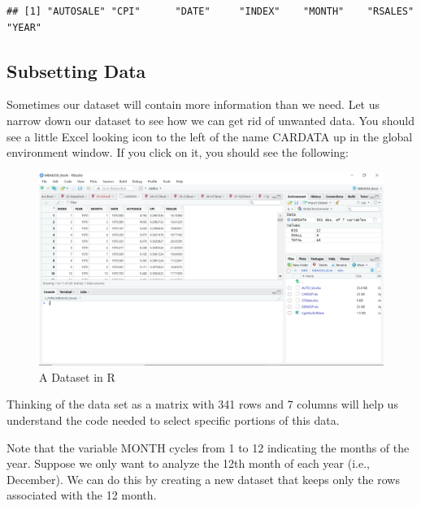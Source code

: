 \documentclass[
]{book}
\newenvironment{Shaded}{\begin{snugshade}}{\end{snugshade}}
\newcommand{\DecValTok}[1]{\textcolor[rgb]{0.00,0.00,0.81}{#1}}
\newcommand{\NormalTok}[1]{#1}
\newcommand{\OtherTok}[1]{\textcolor[rgb]{0.56,0.35,0.01}{#1}}
\newcommand{\SpecialCharTok}[1]{\textcolor[rgb]{0.00,0.00,0.00}{#1}}
\begin{document}
\begin{verbatim}
## [1] "AUTOSALE" "CPI"      "DATE"     "INDEX"    "MONTH"    "RSALES"   "YEAR"
\end{verbatim}

\hypertarget{subsetting-data}{%
\subsection{Subsetting Data}\label{subsetting-data}}

Sometimes our dataset will contain more information than we need. Let us narrow down our dataset to see how we can get rid of unwanted data. You should see a little Excel looking icon to the left of the name CARDATA up in the global environment window. If you click on it, you should see the following:

\begin{figure}

{\centering \includegraphics[width=0.75\linewidth]{images/Screenshot4} 

}

\caption{A Dataset in R}\label{fig:unnamed-chunk-40}
\end{figure}

Thinking of the data set as a matrix with 341 rows and 7 columns will help us understand the code needed to select specific portions of this data.

Note that the variable MONTH cycles from 1 to 12 indicating the months of the year. Suppose we only want to analyze the 12th month of each year (i.e., December). We can do this by creating a new dataset that keeps only the rows associated with the 12 month.

\begin{Shaded}
\end{Shaded}
\end{document}
